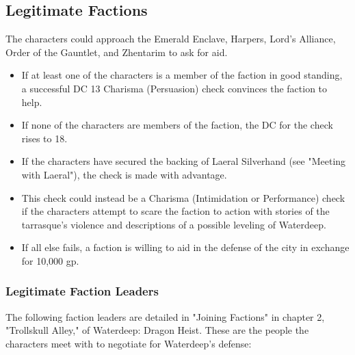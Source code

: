 \documentclass[10pt,a4paper,twoside,bg=print,twocolumn,openany,nodeprecatedcode]{dndbook}
\begin{document}
\subsection{Legitimate Factions}
The characters could approach the Emerald Enclave, Harpers, Lord's Alliance, Order of the Gauntlet, and Zhentarim to ask for aid.


\begin{itemize}
\item If at least one of the characters is a member of the faction in good standing, a successful DC 13 Charisma (Persuasion) check convinces the faction to help.
\item If none of the characters are members of the faction, the DC for the check rises to 18.
\item If the characters have secured the backing of Laeral Silverhand (see "Meeting with Laeral"), the check is made with advantage.
\item This check could instead be a Charisma (Intimidation or Performance) check if the characters attempt to scare the faction to action with stories of the tarrasque's violence and descriptions of a possible leveling of Waterdeep.
\item If all else fails, a faction is willing to aid in the defense of the city in exchange for 10,000 gp.
\end{itemize}

\subsubsection{Legitimate Faction Leaders}
The following faction leaders are detailed in "Joining Factions" in chapter 2, "Trollskull Alley," of Waterdeep: Dragon Heist. These are the people the characters meet with to negotiate for Waterdeep's defense:
\end{document}
